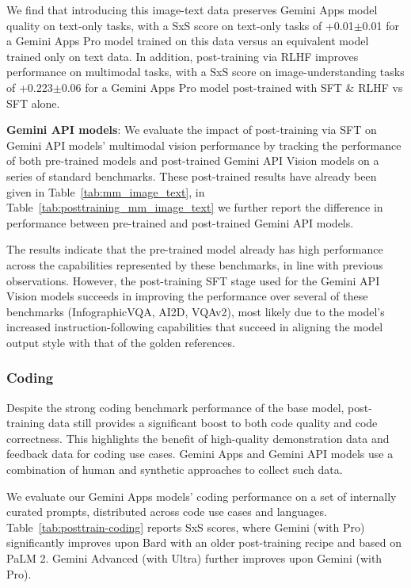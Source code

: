 We find that introducing this image-text data preserves Gemini Apps model quality on text-only tasks, with a SxS score on text-only tasks of +0.01$\pm$0.01 for a Gemini Apps Pro model trained on this data versus an equivalent model trained only on text data. In addition, post-training via RLHF improves performance on multimodal tasks, with a SxS score on image-understanding tasks of +0.223$\pm$0.06 for a Gemini Apps Pro model post-trained with SFT \& RLHF vs SFT alone.

\textbf{Gemini API models}: We evaluate the impact of post-training via SFT on Gemini API models’ multimodal vision performance by tracking the performance of both pre-trained models and post-trained Gemini API Vision models on a series of standard benchmarks. These post-trained results have already been given in Table~\ref{tab:mm_image_text}, in Table~\ref{tab:posttraining_mm_image_text} we further report the difference in performance between  pre-trained and post-trained Gemini API models.


The results indicate that the pre-trained model already has high performance across the capabilities represented by these benchmarks, in line with previous observations. However, the post-training SFT stage used for the Gemini API Vision models succeeds in improving the performance over several of these benchmarks (InfographicVQA, AI2D, VQAv2), most likely due to the model’s increased instruction-following capabilities that succeed in aligning the model output style with that of the golden references.

\subsubsection{Coding}

Despite the strong coding benchmark performance of the base model, post-training data still provides a significant boost to both code quality and code correctness. This highlights the benefit of high-quality demonstration data and feedback data for coding use cases. Gemini Apps and Gemini API models use a combination of human and synthetic approaches to collect such data.

We evaluate our Gemini Apps models’ coding performance on a set of internally curated prompts, distributed across code use cases and languages. Table~\ref{tab:posttrain-coding} reports SxS scores, where Gemini (with Pro) significantly improves upon Bard with an older post-training recipe and based on PaLM 2. Gemini Advanced (with Ultra) further improves upon Gemini (with Pro). 

